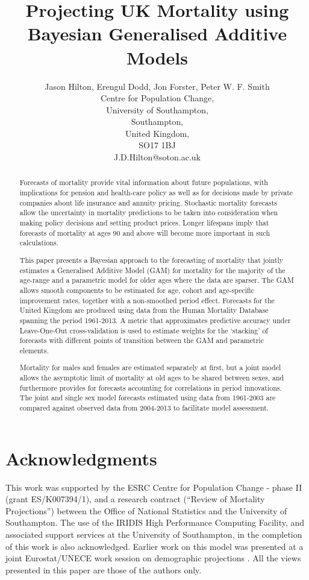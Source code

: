 \documentclass[10pt,a4paper]{article}
\title{Projecting UK Mortality using Bayesian Generalised Additive Models}
\author{Jason Hilton, Erengul Dodd, Jon Forster, Peter W. F. Smith\\
Centre for Population Change,\\
University of Southampton,\\
Southampton,\\
United Kingdom,\\
SO17 1BJ \\
J.D.Hilton@soton.ac.uk
}
\begin{document}
\maketitle
\begin{abstract}
Forecasts of mortality provide vital information about future populations, with implications for  pension and health-care policy as well as for decisions made by private companies about life insurance and annuity pricing. Stochastic mortality forecasts allow the uncertainty in mortality predictions to be taken into consideration when making policy decisions and setting product prices. Longer lifespans imply that forecasts of mortality at ages 90 and above will become more important in such calculations.

This paper presents a Bayesian approach to the forecasting of mortality that jointly estimates a Generalised Additive Model (GAM) for mortality for the majority of the age-range and a parametric model for older ages where the data are sparser. The GAM allows smooth components to be estimated for age, cohort and age-specific improvement rates, together with a non-smoothed period effect.  Forecasts for the United Kingdom are produced using data from the Human Mortality Database spanning the period 1961-2013. A metric that approximates predictive accuracy under Leave-One-Out cross-validation is used to estimate weights for the `stacking' of forecasts with different points of transition between the GAM and parametric elements.

Mortality for males and females are estimated separately at first, but a joint model allows the asymptotic limit of mortality at old ages to be shared between sexes, and furthermore provides for forecasts accounting for correlations in period innovations. The joint and single sex model forecasts estimated using data from 1961-2003 are compared against observed data from 2004-2013 to facilitate model assessment.
\end{abstract}

\section*{Acknowledgments}\label{acknowledgments}

This work was supported by the ESRC Centre for Population Change - phase II (grant ES/K007394/1), and a research contract (“Review of Mortality Projections”) between the Office of National Statistics and the University of Southampton. The use of the IRIDIS High Performance Computing Facility, and associated support services at the University of Southampton, in the completion of this work is also acknowledged. Earlier work on this model was presented at a joint Eurostat/UNECE work session on demographic projections \citep{Forster2016}. All the views presented in this paper are those of the authors only.






\end{document}
